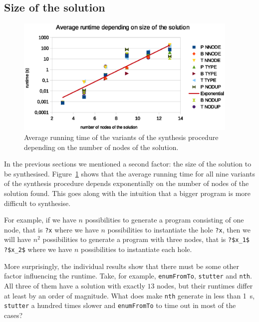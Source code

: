 \subsection{Size of the solution}
\begin{figure}[p]
    \centering
    \includegraphics[width=0.95\textwidth]{time_vs_nof_nodes.eps}
    \caption{Average running time of the variants of the synthesis procedure depending on the number of nodes of the solution.}
    \label{fig:runtime_vs_nof_nodes}
\end{figure}
In the previous sections we mentioned a second factor: the size of the solution to be synthesised. Figure~\ref{fig:runtime_vs_nof_nodes} shows that the average running time for all nine variants of the synthesis procedure depends exponentially on the number of nodes of the solution found. This goes along with the intuition that a bigger program is more difficult to synthesise.

For example, if we have $n$ possibilities to generate a program consisting of one node, that is \lstinline!?x! where we have $n$ possibilities to instantiate the hole \lstinline!?x!, then we will have $n^2$ possibilities to generate a program with three nodes, that is \lstinline!?$x_1$ ?$x_2$! where we have $n$ possibilities to instantiate each hole.


More surprisingly, the individual results show that there must be some other factor influencing the runtime. Take, for example, \lstinline?enumFromTo?, \lstinline?stutter? and \lstinline?nth?. All three of them have a solution with exactly $13$ nodes, but their runtimes differ at least by an order of magnitude. What does make \lstinline?nth? generate in less than \SI{1}{s}, \lstinline?stutter? a hundred times slower and \lstinline?enumFromTo? to time out in most of the cases?

